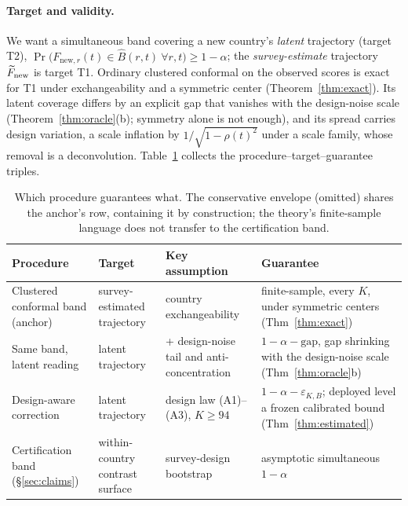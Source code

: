 \paragraph{Target and validity.} We want a simultaneous band covering a
new country's \emph{latent} trajectory (target T2),
$\Pr\big(F_{\text{new}, r}(t)\in\widehat B(r, t)\ \forall r, t\big)\ge1-\alpha$;
the \emph{survey-estimate} trajectory $\widetilde{F}_{\text{new}}$ is target T1.
Ordinary clustered conformal on the observed scores is exact for T1 under
exchangeability and a symmetric center (Theorem~\ref{thm:exact}). Its latent
coverage differs by an explicit gap that vanishes with the design-noise
scale (Theorem~\ref{thm:oracle}(b); symmetry alone is not enough), and its
spread carries design variation, a scale inflation by
$1/\sqrt{1-\rho(t)^2}$ under a scale family, whose removal is a
deconvolution. Table~\ref{tab:targets} collects the
procedure--target--guarantee triples.

\begin{table}[t]
\centering\small
\begin{tabular}{@{}p{}p{}p{}p{}@{}}
\toprule
Procedure & Target & Key assumption & Guarantee \\
\midrule
Clustered conformal band (anchor) & survey-estimated trajectory &
  country exchangeability & finite-sample, every $K$, under symmetric centers
  (Thm~\ref{thm:exact}) \\
\addlinespace[2pt]
Same band, latent reading & latent trajectory & + design-noise tail and
  anti-concentration & $1{-}\alpha{-}\mathrm{gap}$, gap shrinking with the
  design-noise scale (Thm~\ref{thm:oracle}b) \\
\addlinespace[2pt]
Design-aware correction & latent trajectory & design law (A1)--(A3),
  $K\ge94$ & $1{-}\alpha{-}\varepsilon_{K,B}$; deployed level a frozen
  calibrated bound (Thm~\ref{thm:estimated}) \\
\addlinespace[2pt]
Certification band (\S\ref{sec:claims}) & within-country contrast surface &
  survey-design bootstrap & asymptotic simultaneous $1{-}\alpha$ \\
\bottomrule
\end{tabular}
\caption{Which procedure guarantees what. The conservative envelope (omitted)
shares the anchor's row, containing it by construction; the theory's
finite-sample language does not transfer to the certification
band.}\label{tab:targets}
\end{table}


